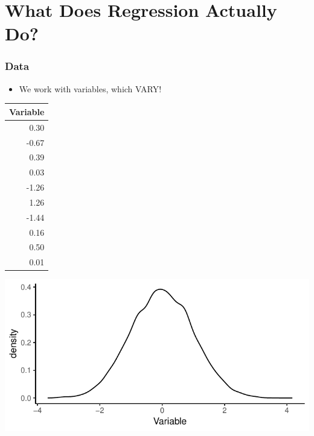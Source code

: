 \documentclass[xcolor=x11names,compress]{beamer}\usepackage[]{graphicx}\usepackage[]{color}
\makeatletter
\def\maxwidth{ %
  \ifdim\Gin@nat@width>\linewidth
    \linewidth
  \else
    \Gin@nat@width
  \fi
}
\newenvironment{knitrout}{}{} %
\renewcommand{\(}{\begin{columns}}
\renewcommand{\)}{\end{columns}}
\newcommand{\<}[1]{\begin{column}{#1}}
\renewcommand{\>}{\end{column}}
\makeatother
\begin{document}
\section{What Does Regression Actually Do?}

\begin{frame}
\frametitle{Data}
\begin{itemize}
\item We work with variables, which VARY!
\end{itemize}
\begin{multicols}{2}
\begin{table}[ht]
\centering
\begin{tabular}{r}
  \hline
Variable \\ 
  \hline
0.30 \\ 
  -0.67 \\ 
  0.39 \\ 
  0.03 \\ 
  -1.26 \\ 
  1.26 \\ 
  -1.44 \\ 
  0.16 \\ 
  0.50 \\ 
  0.01 \\ 
   \hline
\end{tabular}
\end{table}

\columnbreak
\begin{knitrout}
\color{fgcolor}
\includegraphics[width=\maxwidth]{figure/var2-1} 

\end{knitrout}
\end{multicols}
\end{frame}
\end{document}
